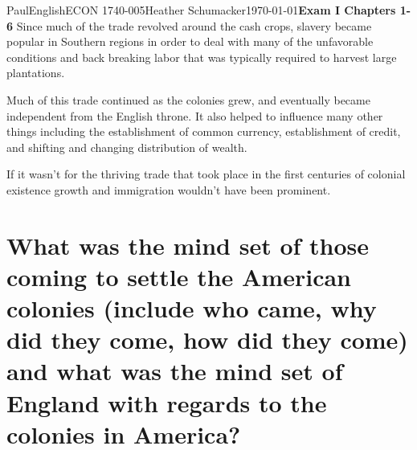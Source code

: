 \documentclass[12pt,letterpaper]{article}
\begin{document}
\begin{mla}{Paul}{English}{ECON 1740-005}{Heather
    Schumacker}{\today}{\textbf{Exam I Chapters 1-6}}
Since much of the trade revolved around the cash crops, slavery became
popular in Southern regions in order to deal with many of the
unfavorable conditions and back breaking labor that was typically
required to harvest large plantations. 

Much of this trade continued as the colonies grew, and eventually
became independent from the English throne. It also helped to
influence many other things including the establishment of common
currency, establishment of credit, and shifting and changing
distribution of wealth.

If it wasn't for the thriving trade that took place in the first
centuries of colonial existence growth and immigration wouldn't have
been prominent.












\pagebreak

\singlespacing
\section{What was the mind set of those coming to settle the American
  colonies (include who came, why did they come, how did they come)
  and what was the mind set of England with regards to the colonies in
  America?}
\doublespacing


\end{mla}
\end{document}
